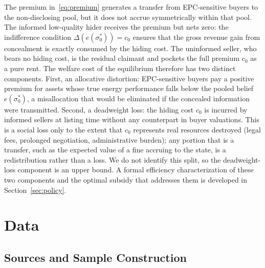 \documentclass[10pt,letterpaper]{bp-template-concise}
\begin{document}
The premium in~\eqref{eq:premium} generates a transfer from EPC-sensitive buyers to the non-disclosing pool, but it does not accrue symmetrically within that pool. The informed low-quality hider receives the premium but nets zero: the indifference condition $\Delta(e(\sigma_0^*))=c_0$ ensures that the gross revenue gain from concealment is exactly consumed by the hiding cost. The uninformed seller, who bears no hiding cost, is the residual claimant and pockets the full premium $c_0$ as a pure rent. The welfare cost of the equilibrium therefore has two distinct components. First, an allocative distortion: EPC-sensitive buyers pay a positive premium for assets whose true energy performance falls below the pooled belief $e(\sigma_0^*)$, a misallocation that would be eliminated if the concealed information were transmitted. Second, a deadweight loss: the hiding cost $c_0$ is incurred by informed sellers at listing time without any counterpart in buyer valuations. This is a social loss only to the extent that $c_0$ represents real resources destroyed (legal fees, prolonged negotiation, administrative burden); any portion that is a transfer, such as the expected value of a fine accruing to the state, is a redistribution rather than a loss. We do not identify this split, so the deadweight-loss component is an upper bound. A formal efficiency characterization of these two components and the optimal subsidy that addresses them is developed in Section~\ref{sec:policy}.

\section{Data}
\label{sec:data}

\subsection{Sources and Sample Construction}
\end{document}

